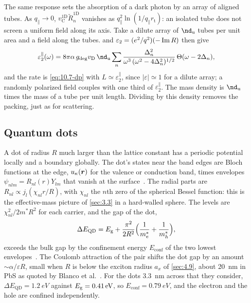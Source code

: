 The same response sets the absorption of a dark photon by an array of aligned tubes. As $q_\parallel \to 0$, $v_{\mathrm{C}}^{\mathrm{1D}}\tilde R^{\mathrm{1D}}_n$ vanishes as $q_\parallel^2\ln(1/q_\parallel r_{\mathrm{t}})$: an isolated tube does not screen a uniform field along its axis. Take a dilute array of $\nd_{\mathrm{u}}$ tubes per unit area and a field along the tubes.  and $\varepsilon_2 = (e^2/q^2)(-\operatorname{Im} R)$ then give
\begin{equation}
  \varepsilon_2^{\parallel}(\omega) = 8\pi\alpha\,g_{\mathrm{deg}}v_{\mathrm{D}}\,\nd_{\mathrm{u}}\sum_n\frac{\Delta_n^2}{\omega^3\,(\omega^2 - 4\Delta_n^2)^{1/2}}\,\Theta(\omega - 2\Delta_n) ,
  \label{eq:16.3-eps2}
\end{equation}
and the rate is \cref{eq:10.7-dp} with $L \simeq \varepsilon_2^{\parallel}$, since $|\varepsilon| \simeq 1$ for a dilute array; a randomly polarized field couples with one third of $\varepsilon_2^{\parallel}$. The mass density is $\nd_{\mathrm{u}}$ times the mass of a tube per unit length. Dividing by this density removes the packing, just as for scattering.

\subsection{Quantum dots}\label{sec:16.3-dots}

A dot of radius $R$ much larger than the lattice constant has a periodic potential locally and a boundary globally. The dot's states near the band edges are Bloch functions at the edge, $u_\kappa(\bm{r})$ for the valence or conduction band, times envelopes $\psi_{nlm} = R_{nl}(r)Y_{lm}$ that vanish at the surface~\cite[Eqs.~(2)--(4)]{blanco2023dark}. The radial parts are $R_{nl} \propto j_l(\chi_{nl}r/R)$, with $\chi_{nl}$ the $n$th zero of the spherical Bessel function: this is the effective-mass picture of \cref{sec:3.3} in a hard-walled sphere. The levels are $\chi_{nl}^2/2m^*R^2$ for each carrier, and the gap of the dot,
\begin{equation}
  \Delta E_{\mathrm{QD}} = E_{\mathrm{g}} + \frac{\pi^2}{2R^2}\Bigl(\frac{1}{m_e^*} + \frac{1}{m_h^*}\Bigr) ,
  \label{eq:16.3-gap}
\end{equation}
exceeds the bulk gap by the confinement energy $E_{\mathrm{conf}}$ of the two lowest envelopes~\cite[Eq.~(5)]{blanco2023dark}. The Coulomb attraction of the pair shifts the dot gap by an amount $\sim\alpha/\varepsilon R$, small when $R$ is below the exciton radius $a_x$ of \cref{sec:4.9}, about \SI{20}{nm} in PbS as quoted by Blanco et al.~\cite{blanco2023dark}. For the dots \SI{3.3}{nm} across that they consider, $\Delta E_{\mathrm{QD}} = \SI{1.2}{eV}$ against $E_{\mathrm{g}} = \SI{0.41}{eV}$, so $E_{\mathrm{conf}} = \SI{0.79}{eV}$, and the electron and the hole are confined independently.

